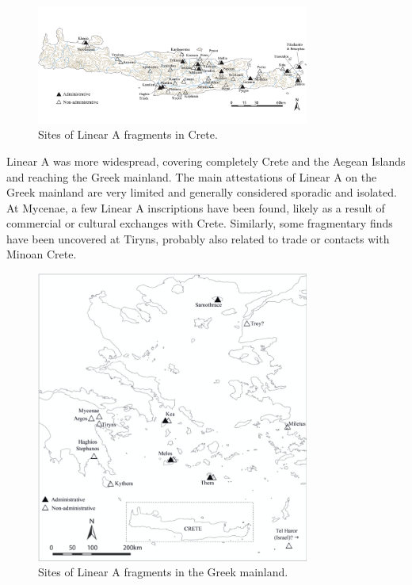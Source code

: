 \begin{figure}[H]
    \centering
    \includegraphics[width=0.8\textwidth]{Images/crete_LA.png} %
    \caption{Sites of Linear A fragments in Crete. \protect\footnotemark}
    \label{fig:crete_LA}
\end{figure}

Linear A was more widespread, covering completely Crete and the Aegean Islands and reaching the Greek mainland.
The main attestations of Linear A on the Greek mainland are very limited and generally considered sporadic and isolated. 
At Mycenae, a few Linear A inscriptions have been found, likely as a result of commercial or cultural exchanges with Crete. 
Similarly, some fragmentary finds have been uncovered at Tiryns, probably also related to trade or contacts with Minoan Crete.

\begin{figure}[H]
    \centering
    \includegraphics[width=0.8\textwidth]{Images/mainland_LA.jpg} %
    \caption{Sites of Linear A fragments in the Greek mainland. \protect\footnotemark}
    \label{fig:mainland_LA}
\end{figure}

